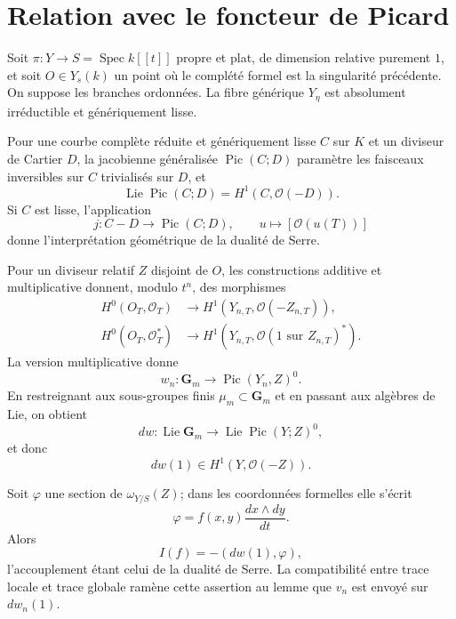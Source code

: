 \documentclass[11pt]{article}
\DeclareMathOperator{\Spec}{Spec}
\DeclareMathOperator{\Lie}{Lie}
\DeclareMathOperator{\Pic}{Pic}
\newcommand{\OO}{\mathcal O}
\newcommand{\Gm}{\mathbf G_m}
\begin{document}
\section{Relation avec le foncteur de Picard}

Soit $\pi:Y\to S=\Spec k[[t]]$ propre et plat, de dimension relative purement $1$, et soit $O\in Y_s(k)$ un point où le complété formel est la singularité précédente. On suppose les branches ordonnées. La fibre générique $Y_\eta$ est absolument irréductible et génériquement lisse.

Pour une courbe complète réduite et génériquement lisse $C$ sur $K$ et un diviseur de Cartier $D$, la jacobienne généralisée $\Pic(C;D)$ paramètre les faisceaux inversibles sur $C$ trivialisés sur $D$, et
\begin{equation}\tag{2.3.1}
 \Lie\Pic(C;D)=H^1(C,\OO(-D)).
\end{equation}
Si $C$ est lisse, l'application
\begin{equation}\tag{2.3.2}
 j:C-D\to\Pic(C;D),\qquad u\mapsto[\OO(u(T))]
\end{equation}
donne l'interprétation géométrique de la dualité de Serre.

Pour un diviseur relatif $Z$ disjoint de $O$, les constructions additive et multiplicative donnent, modulo $t^n$, des morphismes
\begin{align}\tag{2.4.6}
 H^0(O_T,\OO_T)&\to H^1(Y_{n,T},\OO(-Z_{n,T})),\\
\tag{2.4.7}
 H^0(O_T,\OO_T^*)&\to H^1(Y_{n,T},\OO(1\text{ sur }Z_{n,T})^*).
\end{align}
La version multiplicative donne
\begin{equation}\tag{2.4.8}
 w_n:\Gm\to\Pic(Y_n,Z)^0.
\end{equation}
En restreignant aux sous-groupes finis $\mu_m\subset\Gm$ et en passant aux algèbres de Lie, on obtient
\begin{equation}\tag{2.4.10}
 dw:\Lie\Gm\to\Lie\Pic(Y;Z)^0,
\end{equation}
et donc
\begin{equation}\tag{2.4.11}
 dw(1)\in H^1(Y,\OO(-Z)).
\end{equation}

Soit $\varphi$ une section de $\omega_{Y/S}(Z)$; dans les coordonnées formelles elle s'écrit
\[
 \varphi=f(x,y)\frac{dx\wedge dy}{dt}.
\]
Alors
\begin{equation}\tag{2.5.1}
 I(f)=-(dw(1),\varphi),
\end{equation}
l'accouplement étant celui de la dualité de Serre. La compatibilité entre trace locale et trace globale ramène cette assertion au lemme que $v_n$ est envoyé sur $dw_n(1)$.
\end{document}
